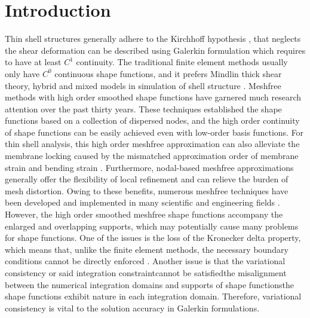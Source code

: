 \section{Introduction}\label{introduction}
Thin shell structures generally adhere to the Kirchhoff hypothesis \cite{donnell1976}, that neglects the shear deformation can be described using Galerkin formulation which requires to have at least $C^1$ continuity. The traditional finite element methods usually only have $C^0$ continuous shape functions, and it prefers Mindlin thick shear theory, hybrid and mixed models in simulation of shell structure  \cite{hughes2000}. Meshfree methods \cite{belytschko1994,liu1995,chen2017} with high order smoothed shape functions have garnered much research attention over the past thirty years. These techniques established the shape functions based on a collection of dispersed nodes, and the high order continuity of shape functions can be easily achieved even with low-order basis functions. For thin shell analysis, this high order meshfree approximation can also alleviate the membrane locking caused by the mismatched approximation order of membrane strain and bending strain \cite{krysl1996}. Furthermore, nodal-based meshfree approximations generally offer the flexibility of local refinement and can relieve the burden of mesh distortion. Owing to these benefits, numerous meshfree techniques have been developed and implemented in many scientific and engineering fields \DIFdelbegin {}\DIFdelend \DIFaddbegin {}\DIFaddend . However, the high order smoothed meshfree shape functions accompany the enlarged and overlapping supports, which may potentially cause many problems for shape functions. One of the issues is the loss of the Kronecker delta property, which means that, unlike the finite element methods, the necessary boundary conditions cannot be directly enforced  \cite{fernandez-mendez2004}. Another issue is that the variational consistency or said integration constraint\DIFaddbegin {}\DIFaddend cannot be satisfied\DIFdelbegin {}\DIFdelend \DIFaddbegin {}\DIFaddend the misalignment between the numerical integration domains and supports of shape functions\DIFdelbegin {}\DIFdelend \DIFaddbegin {}\DIFaddend the shape functions exhibit \DIFdelbegin {}\DIFdelend \DIFaddbegin {}\DIFaddend nature in each integration domain. \DIFaddbegin {}\DIFaddend Therefore, variational consistency is vital to the solution accuracy in Galerkin formulations\DIFdelbegin {}\DIFdelend .

